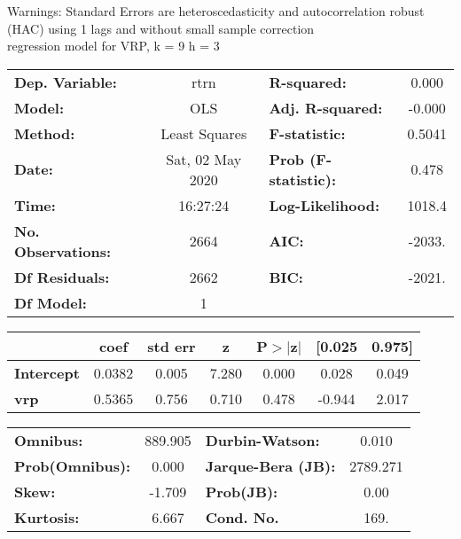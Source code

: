 Warnings: \newline
 [1] Standard Errors are heteroscedasticity and autocorrelation robust (HAC) using 1 lags and without small sample correction\\ 

regression model for VRP, k = 9 h = 3\begin{center}
\begin{tabular}{lclc}
\toprule
\textbf{Dep. Variable:}    &       rtrn       & \textbf{  R-squared:         } &     0.000   \\
\textbf{Model:}            &       OLS        & \textbf{  Adj. R-squared:    } &    -0.000   \\
\textbf{Method:}           &  Least Squares   & \textbf{  F-statistic:       } &    0.5041   \\
\textbf{Date:}             & Sat, 02 May 2020 & \textbf{  Prob (F-statistic):} &    0.478    \\
\textbf{Time:}             &     16:27:24     & \textbf{  Log-Likelihood:    } &    1018.4   \\
\textbf{No. Observations:} &        2664      & \textbf{  AIC:               } &    -2033.   \\
\textbf{Df Residuals:}     &        2662      & \textbf{  BIC:               } &    -2021.   \\
\textbf{Df Model:}         &           1      & \textbf{                     } &             \\
\bottomrule
\end{tabular}
\begin{tabular}{lcccccc}
                   & \textbf{coef} & \textbf{std err} & \textbf{z} & \textbf{P$> |$z$|$} & \textbf{[0.025} & \textbf{0.975]}  \\
\midrule
\textbf{Intercept} &       0.0382  &        0.005     &     7.280  &         0.000        &        0.028    &        0.049     \\
\textbf{vrp}       &       0.5365  &        0.756     &     0.710  &         0.478        &       -0.944    &        2.017     \\
\bottomrule
\end{tabular}
\begin{tabular}{lclc}
\textbf{Omnibus:}       & 889.905 & \textbf{  Durbin-Watson:     } &    0.010  \\
\textbf{Prob(Omnibus):} &   0.000 & \textbf{  Jarque-Bera (JB):  } & 2789.271  \\
\textbf{Skew:}          &  -1.709 & \textbf{  Prob(JB):          } &     0.00  \\
\textbf{Kurtosis:}      &   6.667 & \textbf{  Cond. No.          } &     169.  \\
\bottomrule
\end{tabular}
\end{center}

